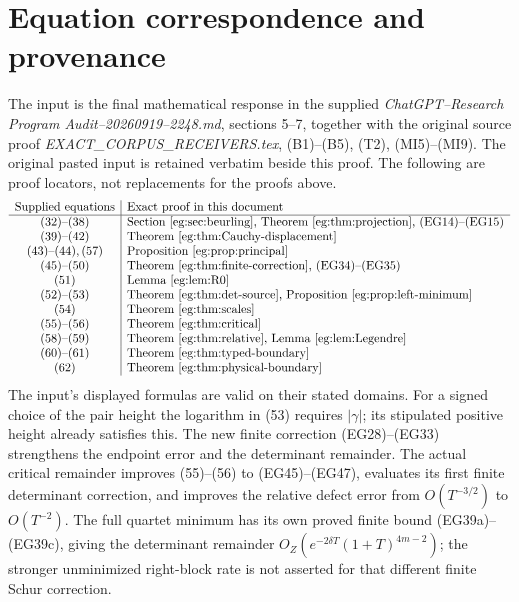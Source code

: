 \section{Equation correspondence and provenance}\label{eg:sec:correspondence}
The input is the final mathematical response in the supplied
\emph{ChatGPT--Research Program Audit--20260919--2248.md}, sections
5--7, together with the original source proof
\emph{EXACT\_CORPUS\_RECEIVERS.tex}, (B1)--(B5), (T2), (MI5)--(MI9).
The original pasted input is retained verbatim beside this proof.
The following are proof locators, not replacements for the proofs above.
\[
\begin{array}{c|l}
\text{Supplied equations}&\text{Exact proof in this document}\\\hline
(32)\text{--}(38)&\text{Section \ref{eg:sec:beurling}, Theorem \ref{eg:thm:projection}, (EG14)--(EG15)}\\
(39)\text{--}(42)&\text{Theorem \ref{eg:thm:Cauchy-displacement}}\\
(43)\text{--}(44),(57)&\text{Proposition \ref{eg:prop:principal}}\\
(45)\text{--}(50)&\text{Theorem \ref{eg:thm:finite-correction}, (EG34)--(EG35)}\\
(51)&\text{Lemma \ref{eg:lem:R0}}\\
(52)\text{--}(53)&\text{Theorem \ref{eg:thm:det-source}, Proposition \ref{eg:prop:left-minimum}}\\
(54)&\text{Theorem \ref{eg:thm:scales}}\\
(55)\text{--}(56)&\text{Theorem \ref{eg:thm:critical}}\\
(58)\text{--}(59)&\text{Theorem \ref{eg:thm:relative}, Lemma \ref{eg:lem:Legendre}}\\
(60)\text{--}(61)&\text{Theorem \ref{eg:thm:typed-boundary}}\\
(62)&\text{Theorem \ref{eg:thm:physical-boundary}}
\end{array}
\]
The input's displayed formulas are valid on their stated domains.
For a signed choice of the pair height the logarithm in (53) requires
$|\gamma|$; its stipulated positive height already satisfies this.
The new finite correction (EG28)--(EG33) strengthens the endpoint
error and the determinant remainder. The actual critical remainder
improves (55)--(56) to (EG45)--(EG47), evaluates its first finite
determinant correction, and improves the relative defect error from
$O(T^{-3/2})$ to $O(T^{-2})$. The full quartet minimum has its own
proved finite bound (EG39a)--(EG39c), giving the determinant
remainder $O_Z(e^{-2\delta T}(1+T)^{4m-2})$; the stronger
unminimized right-block rate is not asserted for that different
finite Schur correction.

